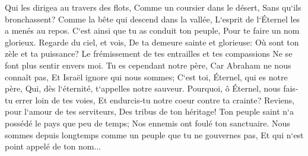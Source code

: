 \verse Qui les dirigea au travers des flots, Comme un coursier dans le désert, Sans qu`ils bronchassent? 
\verse Comme la bête qui descend dans la vallée, L`esprit de l`Éternel les a menés au repos. C`est ainsi que tu as conduit ton peuple, Pour te faire un nom glorieux. 
\verse Regarde du ciel, et vois, De ta demeure sainte et glorieuse: Où sont ton zèle et ta puissance? Le frémissement de tes entrailles et tes compassions Ne se font plus sentir envers moi. 
\verse Tu es cependant notre père, Car Abraham ne nous connaît pas, Et Israël ignore qui nous sommes; C`est toi, Éternel, qui es notre père, Qui, dès l`éternité, t`appelles notre sauveur. 
\verse Pourquoi, ô Éternel, nous fais-tu errer loin de tes voies, Et endurcis-tu notre coeur contre ta crainte? Reviens, pour l`amour de tes serviteurs, Des tribus de ton héritage! 
\verse Ton peuple saint n`a possédé le pays que peu de temps; Nos ennemis ont foulé ton sanctuaire. 
\verse Nous sommes depuis longtemps comme un peuple que tu ne gouvernes pas, Et qui n`est point appelé de ton nom... 

